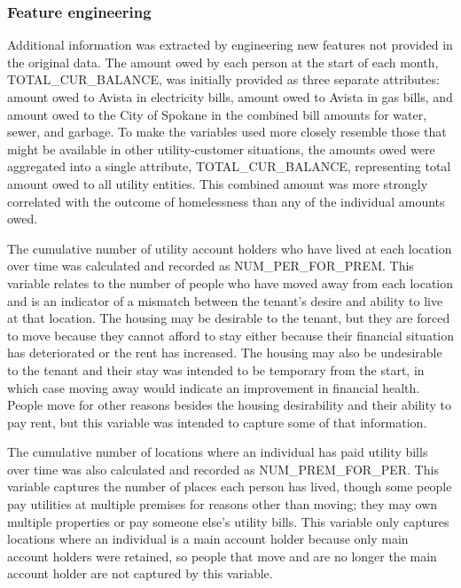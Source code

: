 \documentclass[10pt,letterpaper]{article}
\begin{document}
\subsubsection*{Feature engineering}
Additional information was extracted by engineering new features not provided in the original data. The amount owed by each person at the start of each month, TOTAL\_CUR\_BALANCE, was initially provided as three separate attributes: amount owed to Avista in electricity bills, amount owed to Avista in gas bills, and amount owed to the City of Spokane in the combined bill amounts for water, sewer, and garbage. To make the variables used more closely resemble those that might be available in other utility-customer situations, the amounts owed were aggregated into a single attribute, TOTAL\_CUR\_BALANCE, representing total amount owed to all utility entities. This combined amount was more strongly correlated with the outcome of homelessness than any of the individual amounts owed.

The cumulative number of utility account holders who have lived at each location over time was calculated and recorded as NUM\_PER\_FOR\_PREM. This variable relates to the number of people who have moved away from each location and is an indicator of a mismatch between the tenant's desire and ability to live at that location. The housing may be desirable to the tenant, but they are forced to move because they cannot afford to stay either because their financial situation has deteriorated or the rent has increased. The housing may also be undesirable to the tenant and their stay was intended to be temporary from the start, in which case moving away would indicate an improvement in financial health. People move for other reasons besides the housing desirability and their ability to pay rent, but this variable was intended to capture some of that information.

The cumulative number of locations where an individual has paid utility bills over time was also calculated and recorded as NUM\_PREM\_FOR\_PER. This variable captures the number of places each person has lived, though some people pay utilities at multiple premises for reasons other than moving; they may own multiple properties or pay someone else's utility bills. This variable only captures locations where an individual is a main account holder because only main account holders were retained, so people that move and are no longer the main account holder are not captured by this variable.
\end{document}
